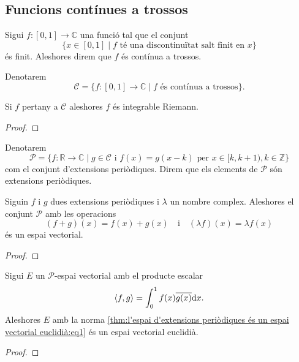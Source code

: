 \documentclass[../Apunts.tex]{subfiles}
\begin{document}
	\subsection{Funcions contínues a trossos}
	\begin{definition}
		\label{def:funció contínua a trossos}
		Sigui \(f\colon[0,1]\longrightarrow\mathbb{C}\) una funció tal que el conjunt
		\[\{x\in[0,1]\mid f\text{ té una discontinuïtat salt finit en }x\}\]
		és finit. Aleshores direm que \(f\) és contínua a trossos.
		
		Denotarem
		\[\mathcal{C}=\{f\colon[0,1]\longrightarrow\mathbb{C}\mid f\text{ és contínua a trossos}\}.\]
	\end{definition}
	\begin{observation}
		\label{obs:les funcions contínues a trossos són integrables}
		Si \(f\) pertany a \(\mathcal{C}\) aleshores \(f\) és integrable Riemann.
		\begin{proof}
		\end{proof}
	\end{observation}
	\begin{definition}
		\label{def:conjunt d'extensions periòdiques}
		Denotarem
		\label{def:extensió periòdica}
		\[\mathcal{P}=\{f\colon\mathbb{R}\longrightarrow\mathbb{C}\mid g\in\mathcal{C}\text{ i }f(x)=g(x-k)\text{ per }x\in[k,k+1),k\in\mathbb{Z}\}\]
		com el conjunt d'extensions periòdiques. Direm que els elements de \(\mathcal{P}\) són extensions periòdiques.
	\end{definition}
	\begin{lemma}
		\label{lema:l'espai d'extensions periòdiques és un espai vectorial}
		Siguin \(f\) i \(g\) dues extensions periòdiques i \(\lambda\) un nombre complex. Aleshores el conjunt \(\mathcal{P}\) amb les operacions
		\[(f+g)(x)=f(x)+g(x)\quad\text{i}\quad(\lambda f)(x)=\lambda f(x)\]
		és un espai vectorial.
		\begin{proof}
		\end{proof}
	\end{lemma}
	\begin{theorem}
		\label{thm:l'espai d'extensions periòdiques és un espai vectorial euclidià}
		Sigui \(E\) un \(\mathcal{P}\)-espai vectorial amb el producte escalar
		\begin{equation}
			\label{thm:l'espai d'extensions periòdiques és un espai vectorial euclidià:eq1}
			\langle f,g\rangle=\int_{0}^{1}f(x)\overline{g(x)}\mathrm{d} x.
		\end{equation}
		Aleshores \(E\) amb la norma \eqref{thm:l'espai d'extensions periòdiques és un espai vectorial euclidià:eq1} és un espai vectorial euclidià.
		\begin{proof}
		\end{proof}
	\end{theorem}
\end{document}
